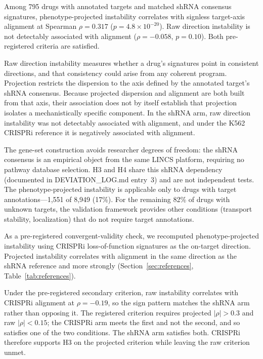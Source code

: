 \documentclass[11pt]{article}
\begin{document}
Among 795 drugs with annotated targets and matched shRNA consensus signatures,
phenotype-projected instability correlates with signless target-axis alignment at
Spearman $\rho = 0.317$ ($p = 4.8 \times 10^{-20}$). Raw direction instability is
not detectably associated with alignment ($\rho = -0.058$, $p = 0.10$). Both
pre-registered criteria are satisfied.

Raw direction instability measures whether a drug's signatures point in
consistent directions, and that consistency could arise from any coherent
program. Projection restricts the dispersion to the axis defined by the
annotated target's shRNA consensus. Because projected dispersion and alignment
are both built from that axis, their association does not by itself establish
that projection isolates a mechanistically specific component. In the shRNA arm,
raw direction instability was not detectably associated with alignment, and under
the K562 CRISPRi reference it is negatively associated with alignment.

The gene-set construction avoids researcher degrees of freedom: the shRNA
consensus is an empirical object from the same LINCS platform,
requiring no pathway database selection. H3 and H4 share this shRNA
dependency (documented in DEVIATION\_LOG.md entry~3) and are not
independent tests. The phenotype-projected instability is applicable only
to drugs with target annotations---1{,}551 of 8{,}949 (17\%). For the
remaining 82\% of drugs with unknown targets, the validation framework
provides other conditions (transport stability, localization) that do not
require target annotations.

As a pre-registered convergent-validity check, we recomputed
phenotype-projected instability using CRISPRi loss-of-function signatures
\citep{replogle2022mapping} as the on-target direction. Projected
instability correlates with alignment in the same direction as the shRNA
reference and more strongly (Section~\ref{sec:references},
Table~\ref{tab:references}).

Under the pre-registered secondary criterion, raw instability correlates
with CRISPRi alignment at $\rho = -0.19$, so the sign pattern matches the
shRNA arm rather than opposing it. The registered criterion requires
projected $|\rho| > 0.3$ and raw $|\rho| < 0.15$; the CRISPRi arm meets
the first and not the second, and so satisfies one of the two conditions.
The shRNA arm satisfies both. CRISPRi therefore supports H3 on the projected
criterion while leaving the raw criterion unmet.
\end{document}
